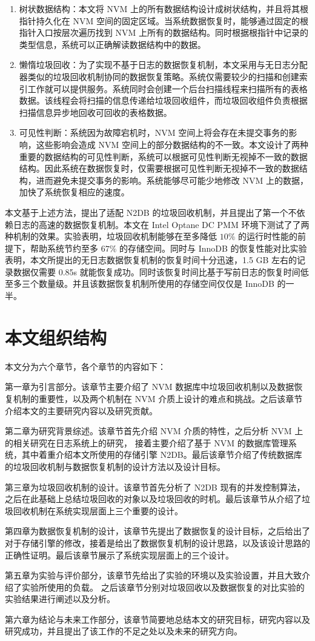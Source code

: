\begin{enumerate}
    \item 树状数据结构：本文将 NVM 上的所有数据结构设计成树状结构，并且将其根指针持久化在 NVM 空间的固定区域。当系统数据恢复时，能够通过固定的根指针入口按层次遍历找到 NVM 上所有的数据结构。同时根据根指针中记录的类型信息，系统可以正确解读数据结构中的数据。
    \item 懒惰垃圾回收：为了实现不基于日志的数据恢复机制，本文采用与无日志分配器类似的垃圾回收机制协同的数据恢复策略。系统仅需要较少的扫描和创建索引工作就可以提供服务。系统同时会创建一个后台扫描线程来扫描所有的表格数据。该线程会将扫描的信息传递给垃圾回收组件，而垃圾回收组件负责根据扫描信息异步地回收可回收的表格数据。
    \item 可见性判断：系统因为故障宕机时，NVM 空间上将会存在未提交事务的影响，这些影响会造成 NVM 空间上的部分数据结构的不一致。本文设计了两种重要的数据结构的可见性判断，系统可以根据可见性判断无视掉不一致的数据结构。因此系统在数据恢复时，仅需要根据可见性判断无视掉不一致的数据结构，进而避免未提交事务的影响。系统能够尽可能少地修改 NVM 上的数据，加快了系统恢复相应的速度。
\end{enumerate}

本文基于上述方法，提出了适配 N2DB 的垃圾回收机制，并且提出了第一个不依赖日志的高速的数据恢复机制。本文在 Intel Optane DC PMM 环境下测试了了两种机制的效果。实验表明，垃圾回收机制能够在至多降低 $10\%$ 的运行时性能的前提下，帮助系统节约至多 $67\%$ 的存储空间。同时与 InnoDB 的恢复性能对比实验表明，本文所提出的无日志数据恢复机制的恢复时间十分迅速，1.5 GB 左右的记录数据仅需要 0.85s 就能恢复成功。同时该恢复时间比基于写前日志的恢复时间低至多三个数量级。并且该数据恢复机制所使用的存储空间仅仅是 InnoDB 的一半。

\section{本文组织结构}

本文分为六个章节，各个章节的内容如下：

第一章为引言部分。该章节主要介绍了 NVM 数据库中垃圾回收机制以及数据恢复机制的重要性，以及两个机制在 NVM 介质上设计的难点和挑战。之后该章节介绍本文的主要研究内容以及研究贡献。

第二章为研究背景综述。该章节首先介绍 NVM 介质的特性，之后分析 NVM 上的相关研究在日志系统上的研究，
接着主要介绍了基于 NVM 的数据库管理系统，其中着重介绍本文所使用的存储引擎 N2DB。最后该章节介绍了传统数据库的垃圾回收机制与数据恢复机制的设计方法以及设计目标。

第三章为垃圾回收机制的设计。该章节首先分析了 N2DB 现有的并发控制算法，之后在此基础上总结垃圾回收的对象以及垃圾回收的时机。最后该章节从介绍了垃圾回收机制在系统实现层面上三个重要的设计。

第四章为数据恢复机制的设计，该章节先提出了数据恢复的设计目标，之后给出了对于存储引擎的修改，接着是给出了数据恢复机制的设计思路，以及该设计思路的正确性证明。最后该章节展示了系统实现层面上的三个设计。

第五章为实验与评价部分，该章节先给出了实验的环境以及实验设置，并且大致介绍了实验所使用的负载。
之后该章节分别对垃圾回收以及数据恢复的对比实验的实验结果进行阐述以及分析。

第六章为结论与未来工作部分，该章节简要地总结本文的研究目标，研究内容以及研究成功，并且提出了该工作的不足之处以及未来的研究方向。


